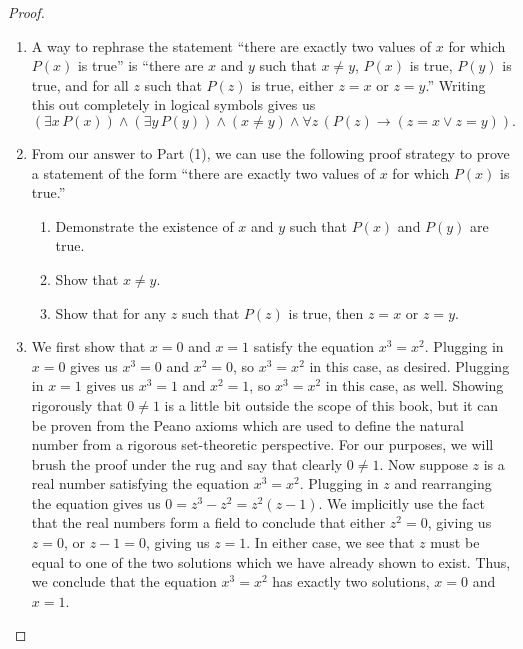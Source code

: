 \documentclass[12pt]{amsart}
\theoremstyle{definition}
\theoremstyle{remark}
\begin{document}
\begin{proof}
\hfill
\begin{enumerate}
	\item A way to rephrase the statement 
	``there are exactly two values of $x$ for which $P(x)$ is true'' is
	``there are $x$ and $y$ such that $x \neq y$, $P(x)$ is true, $P(y)$ is true, and for all
	$z$ such that $P(z)$ is true, either $z = x$ or $z = y$.''
	Writing this out completely in logical symbols gives us
	\begin{equation*}
		(\exists x \, P(x)) \wedge (\exists y \, P(y)) \wedge (x \neq y) \wedge
		\forall z \, (P(z) \rightarrow (z = x \vee z = y)).
	\end{equation*}
	
	\item From our answer to Part (1), we can use the following proof strategy to prove
	a statement of the form
	``there are exactly two values of $x$ for which $P(x)$ is true.''
	\begin{enumerate}
		\item Demonstrate the existence of $x$ and $y$ such that $P(x)$ and $P(y)$ are true.
		
		\item Show that $x \neq y$.
		
		\item Show that for any $z$ such that $P(z)$ is true, then $z = x$ or $z =y$.
	\end{enumerate}
	
	\item We first show that $x = 0$ and $x = 1$ satisfy the equation $x^3 = x^2$.
	Plugging in $x = 0$ gives us $x^3 = 0$ and $x^2 = 0$, so $x^3 = x^2$ in this case, as desired.
	Plugging in $x = 1$ gives us $x^3 = 1$ and $x^2 = 1$, so $x^3 = x^2$ in this case, as well.
	Showing rigorously that $0 \neq 1$ is a little bit outside the scope of this book, but it can be proven
	from the Peano axioms which are used to define the natural number from a rigorous
	set-theoretic perspective.
	For our purposes, we will brush the proof under the rug and say that clearly $0 \neq 1$.
	Now suppose $z$ is a real number satisfying the equation $x^3 = x^2$.
	Plugging in $z$ and rearranging the equation gives us $0 = z^3 - z^2 = z^2(z - 1)$.
	We implicitly use the fact that the real numbers form a field to conclude that either $z^2 = 0$,
	giving us $z = 0$, or $z - 1 = 0$, giving us $z = 1$.
	In either case, we see that $z$ must be equal to one of the two solutions which we have already
	shown to exist.
	Thus, we conclude that the equation $x^3 = x^2$ has exactly two solutions, $x = 0$ and $x = 1$.
\end{enumerate}
\end{proof}
\end{document}
